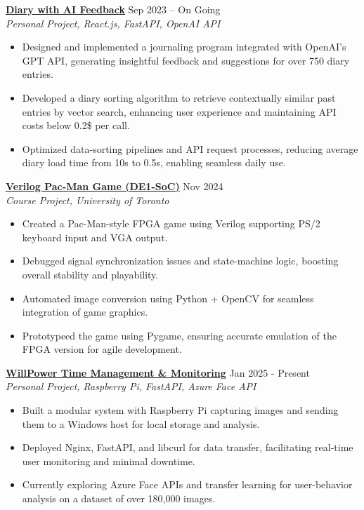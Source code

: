 \documentclass[letterpaper,10pt]{article}
\begin{document}
\vspace{0.3cm}
\noindent\href{https://github.com/Ken-2511/Diary-with-ChatGPT-Comment}{\uline{
\textbf{Diary with AI Feedback}}} \hfill Sep 2023 -- On Going\\
\textit{Personal Project, React.js, FastAPI, OpenAI API}
\begin{itemize}[leftmargin=0.2in]
    \item Designed and implemented a journaling program integrated with OpenAI’s GPT API, generating insightful feedback and suggestions for over 750 diary entries.
    \item Developed a diary sorting algorithm to retrieve contextually similar past entries by vector search, enhancing user experience and maintaining API costs below 0.2\$ per call.
    \item Optimized data-sorting pipelines and API request processes, reducing average diary load time from 10s to 0.5s, enabling seamless daily use.
\end{itemize}


\vspace{0.3cm}
\noindent\href{https://github.com/Ken-2511/ECE241-Project}{\uline{
\textbf{Verilog Pac-Man Game (DE1-SoC)}}} \hfill Nov 2024\\
\textit{Course Project, University of Toronto}
\begin{itemize}[leftmargin=0.2in]
    \item Created a Pac-Man-style FPGA game using Verilog supporting PS/2 keyboard input and VGA output.
    \item Debugged signal synchronization issues and state-machine logic, boosting overall stability and playability.
    \item Automated image conversion using Python + OpenCV for seamless integration of game graphics.
    \item Prototypeed the game using Pygame, ensuring accurate emulation of the FPGA version for agile development.
\end{itemize}

\vspace{0.3cm}
\noindent\href{https://github.com/Ken-2511/WillPower}{\uline{
\textbf{WillPower \textbar{} Time Management \& Monitoring}}} \hfill Jan 2025 - Present\\
\textit{Personal Project, Raspberry Pi, FastAPI, Azure Face API}
\begin{itemize}[leftmargin=0.2in]
    \item Built a modular system with Raspberry Pi capturing images and sending them to a Windows host for local storage and analysis.
    \item Deployed Nginx, FastAPI, and libcurl for data transfer, facilitating real-time user monitoring and minimal downtime.
    \item Currently exploring Azure Face APIs and transfer learning for user-behavior analysis on a dataset of over 180,000 images.
\end{itemize}
\end{document}
